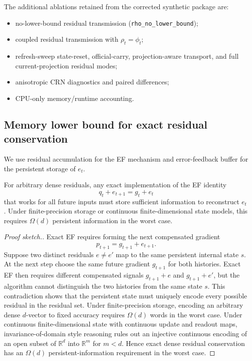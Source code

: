The additional ablations retained from the corrected synthetic package are:
\begin{itemize}
\item no-lower-bound residual transmission (\texttt{rho\_no\_lower\_bound});
\item coupled residual transmission with $\rho_t=\phi_t$;
\item refresh-sweep state-reset, official-carry, projection-aware transport,
and full current-projection residual modes;
\item anisotropic CRN diagnostics and paired differences;
\item CPU-only memory/runtime accounting.
\end{itemize}

\subsection{Memory lower bound for exact residual conservation}

We use residual accumulation for the EF mechanism and error-feedback buffer for
the persistent storage of $e_t$.

\begin{proposition}
\label{prop:memory-lower-bound}
For arbitrary dense residuals, any exact implementation of the EF identity
\[
q_t + e_{t+1} = g_t + e_t
\]
that works for all future inputs must store sufficient information to
reconstruct $e_t$. Under finite-precision storage or continuous
finite-dimensional state models, this requires $\Omega(d)$ persistent
information in the worst case.
\end{proposition}

\begin{proof}[Proof sketch.]
Exact EF requires forming the next compensated gradient
\[
p_{t+1}=g_{t+1}+e_{t+1}.
\]
Suppose two distinct residuals $e\neq e'$ map to the same persistent internal
state $s$. At the next step choose the same future gradient $g_{t+1}$ for both
histories. Exact EF then requires different compensated signals
$g_{t+1}+e$ and $g_{t+1}+e'$, but the algorithm cannot distinguish the two
histories from the same state $s$. This contradiction shows that the
persistent state must uniquely encode every possible residual in the residual
set. Under finite-precision storage, encoding an arbitrary dense $d$-vector to
fixed accuracy requires $\Omega(d)$ words in the worst case. Under continuous
finite-dimensional state with continuous update and readout maps,
invariance-of-domain style reasoning rules out an injective continuous
encoding of an open subset of $\mathbb{R}^d$ into $\mathbb{R}^m$ for $m<d$.
Hence exact dense residual conservation has an $\Omega(d)$
persistent-information requirement in the worst case.
\end{proof}

